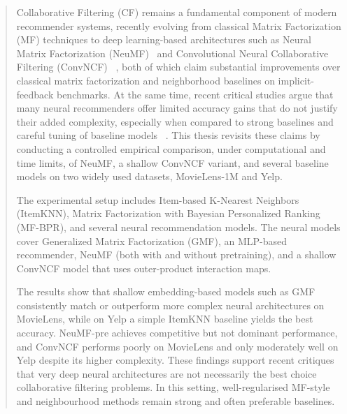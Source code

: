 \documentclass[11pt]{article}
\begin{document}
    



\pagebreak
\begin{abstract}



Collaborative Filtering (CF) remains a fundamental component of modern recommender systems, recently evolving from classical Matrix Factorization (MF) techniques to deep learning-based architectures such as Neural Matrix Factorization (NeuMF)~\cite{he2017neural} and Convolutional Neural Collaborative Filtering (ConvNCF) ~\cite{he2018convncf}, both of which claim substantial improvements over classical matrix factorization and neighborhood baselines on implicit-feedback benchmarks. At the same time, recent critical studies argue that many neural recommenders offer limited accuracy gains that do not justify their added complexity, especially when compared to strong baselines and careful tuning of baseline models ~\cite{rendle2020neural,anelli2021reenvisioning}. This thesis revisits these claims by conducting a controlled empirical comparison, under computational and time limits, of NeuMF, a shallow ConvNCF variant, and several baseline models on two widely used datasets, MovieLens-1M and Yelp.


The experimental setup includes Item-based K-Nearest Neighbors (ItemKNN), Matrix Factorization with Bayesian Personalized Ranking (MF-BPR), and several neural recommendation models. The neural models cover Generalized Matrix Factorization (GMF), an MLP-based recommender, NeuMF (both with and without pretraining), and a shallow ConvNCF model that uses outer-product interaction maps.

The results show that shallow embedding-based models such as GMF consistently match or outperform more complex neural architectures on MovieLens, while on Yelp a simple ItemKNN baseline yields the best accuracy. NeuMF-pre achieves competitive but not dominant performance, and ConvNCF performs poorly on MovieLens and only moderately well on Yelp despite its higher complexity. These findings support recent critiques that very deep neural architectures are not necessarily the best choice collaborative filtering problems. In this setting, well-regularised MF-style and neighbourhood methods remain strong and often preferable baselines.
\end{abstract}
\tableofcontents



\end{document}
